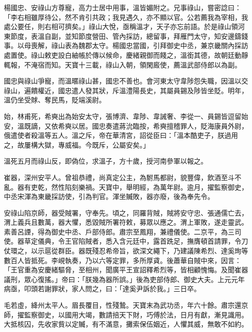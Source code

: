 \begin{pinyinscope}
 楊國忠、安祿山方尊寵，高力士居中用事，溫皆媚附之。兄事祿山，嘗密諗曰：「李右相雖厚待公，然不肯引共政；我見遇久，亦不顯以官。公若薦我為宰相，我處公要任，則右相可擠矣。」祿山大悅，亟稱溫才，天子亦忘前語。於是祿山領河東節度，表溫自副，並知節度營田、管內採訪，總留事，拜雁門太守，知安邊鑄錢事。以母喪解，祿山表為魏郡太守。楊國忠當國，引拜御史中丞，兼京畿關內採訪處置使。祿山敕吏設白紬帳於傳以候命，慶緒親御而餞之，溫銜其德，故朝廷動靜輒報，不淹宿而知。天寶十三載，祿山入朝，領閑廄使，薦溫武部侍郎以為副。



 國忠與祿山爭寵，而溫暱祿山甚，國忠不善也。會河東太守韋陟怨失職，因溫以交祿山，遍饋權近，國忠遣人發其狀，斥溫澧陽長史，其屬員錫及陟皆坐貶。明年，溫仍坐受賕、奪民馬，貶端溪尉。



 始，林甫死，希奭出為始安太守，張博濟、韋陟、韋誡奢、李從一、員錫皆逗留始安，溫既謫，又依希奭以居。國忠奏遣蔣沇臨按，希奭擅稽罪人，貶海康員外尉，俄遣使者殺溫等五人。溫之斥，帝在華清宮，詔從臣曰：「溫本酷吏子，朕過用之，故屢構大獄，專威福。今既斥，公屬安矣。」



 溫死五月而祿山反，即偽位，求溫子，方十歲，授河南參軍以報之。



 崔器，深州安平人。曾祖恭禮，尚真定公主，為駙馬都尉，貌豐偉，飲酒至斗不亂。器有吏乾，然性陷刻樂禍。天寶中，舉明經，為萬年尉。逾月，擢監察御史，中丞宋渾為東畿採訪使，引為判官。渾坐贓敗，器亦廢，後為奉先令。



 安祿山陷京師，器受賊署，守奉先。頃之，同羅背賊，賊將安守忠、張通儒亡去，渭上義兵且數萬，器大懼，悉毀賊所署符敕，募眾以應之。渭上軍敗，遂走靈武。素善呂諲，得為御史中丞、戶部侍郎。肅宗至鳳翔，兼禮儀使。二京平，為三司使。器草定儀典，令王官陷賊者，悉入含元廷中，露首跣足，撫膺頓首請罪，令刀仗環之，以示扈從群臣。器既殘忍希帝旨，欲深文繩下，乃建議陳希烈、達奚珣等數百人皆抵死。李峴執奏，乃以六等定罪，多所厚貣。後蕭華自賊中來，因言：「王官重為安慶緒驅脅，至相州，聞廣平王宣詔釋希烈等，皆相顧愧悔。及聞崔器議刑，眾心復搖。」帝曰：「朕幾為器所誤。」後為吏部侍郎、御史大夫。上元元年病亟，叩頭若謝罪狀，家人問之，曰：「達奚尹訴於我。」三日卒。



 毛若虛，絳州太平人。眉長覆目，性殘鷙。天寶末為武功丞，年六十餘。肅宗還京師，擢監察御史，以國用大竭，數請掊天下財，巧傅於法，日月有獻，漸見識用。大抵核囚，先收家貲以定贓，有不滿意，攤索保伍姻近，人懼其威，無敢不如約。




\end{pinyinscope}
